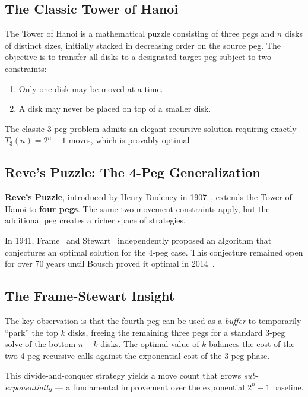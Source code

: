 \documentclass[12pt, a4paper]{article}
\begin{document}
\subsection{The Classic Tower of Hanoi}

The Tower of Hanoi is a mathematical puzzle consisting of three pegs and $n$ disks of distinct sizes, initially stacked in decreasing order on the source peg.
The objective is to transfer all disks to a designated target peg subject to two constraints:

\begin{enumerate}[leftmargin=2em]
    \item Only one disk may be moved at a time.
    \item A disk may never be placed on top of a smaller disk.
\end{enumerate}

The classic 3-peg problem admits an elegant recursive solution requiring exactly $T_3(n) = 2^n - 1$ moves, which is provably optimal~\cite{hinz2013}.

\subsection{Reve's Puzzle: The 4-Peg Generalization}

\textbf{Reve's Puzzle}, introduced by Henry Dudeney in 1907~\cite{dudeney1907}, extends the Tower of Hanoi to \textbf{four pegs}.
The same two movement constraints apply, but the additional peg creates a richer space of strategies.

In 1941, Frame~\cite{frame1941} and Stewart~\cite{stewart1941} independently proposed an algorithm that conjectures an optimal solution for the 4-peg case.
This conjecture remained open for over 70 years until Bousch proved it optimal in 2014~\cite{bousch2014}.

\subsection{The Frame-Stewart Insight}

The key observation is that the fourth peg can be used as a \emph{buffer} to temporarily ``park'' the top $k$ disks, freeing the remaining three pegs for a standard 3-peg solve of the bottom $n - k$ disks.
The optimal value of $k$ balances the cost of the two 4-peg recursive calls against the exponential cost of the 3-peg phase.

This divide-and-conquer strategy yields a move count that grows \emph{sub-exponentially} — a fundamental improvement over the exponential $2^n - 1$ baseline.
\end{document}
